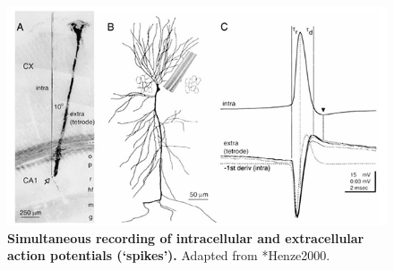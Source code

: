 \begin{figure}[!ht]
\begin{center}
\includegraphics{Figures/Spikes/Spikes-Henze-w100-r150}
\end{center}
\caption[Intracellular and extracellular action potentials]{\textbf{Simultaneous recording of intracellular and extracellular action potentials (`spikes').}
Adapted from \citeasnoun**{Henze2000}.
}
\label{Spikes:fig:Henze}
\end{figure}

